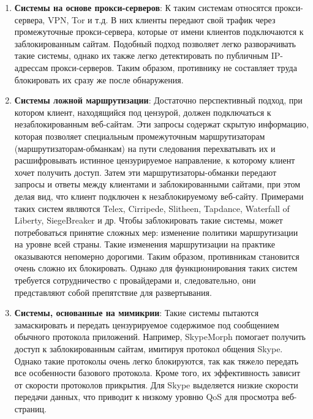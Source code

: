 \begin{enumerate}

    \item \textbf{Системы на основе прокси-серверов}: К таким системам относятся прокси-сервера, VPN, Tor и т.д.
    В них клиенты передают свой трафик через промежуточные прокси-сервера, которые от имени клиентов подключаются к заблокированным сайтам.
    Подобный подход позволяет легко разворачивать такие системы, однако их также легко детектировать по публичным IP-адрессам прокси-серверов.
    Таким образом, противнику не составляет труда блокировать их сразу же после обнаружения.

    \item \textbf{Системы ложной маршрутизации}:
    Достаточно перспективный подход, при котором клиент, находящийся под цензурой, должен подключаться к незаблокированным веб-сайтам.
    Эти запросы содержат скрытую информацию, которая позволяет специальным промежуточным маршрутизаторам \\
    (маршрутизаторам-обманкам) на пути следования перехватывать их и расшифровывать истинное цензурируемое направление, к которому клиент хочет получить доступ.
    Затем эти маршрутизаторы-обманки передают запросы и ответы между клиентами и заблокированными сайтами, при этом делая вид, что клиент подключен к незаблокируемому веб-сайту.
    Примерами таких систем являются Telex, Cirripede, Slitheen, Tapdance, Waterfall of Liberty, SiegeBreaker и др.
    Чтобы заблокировать такие системы, может потребоваться принятие сложных мер: изменение политики маршрутизации на уровне всей страны.
    Такие изменения маршрутизации на практике оказываются непомерно дорогими. Таким образом, противникам становится очень сложно их блокировать.
    Однако для функционирования таких систем требуется сотрудничество с провайдерами и, следовательно, они представляют собой препятствие для развертывания.

    \item \textbf{Системы, основанные на мимикрии}:
    Такие системы пытаются замаскировать и передать цензурируемое содержимое под сообщением обычного протокола приложений.
    Например, SkypeMorph помогает получить доступ к заблокированным сайтам, имитируя протокол общения Skype.
    Однако такие протоколы очень легко блокируются, так как тяжело передать все особенности базового протокола.
    Кроме того, их эффективность зависит от скорости протоколов прикрытия. Для Skype выделяется низкие скорости передачи данных,
    что приводит к низкому уровню QoS для просмотра веб-страниц.


\end{enumerate}
